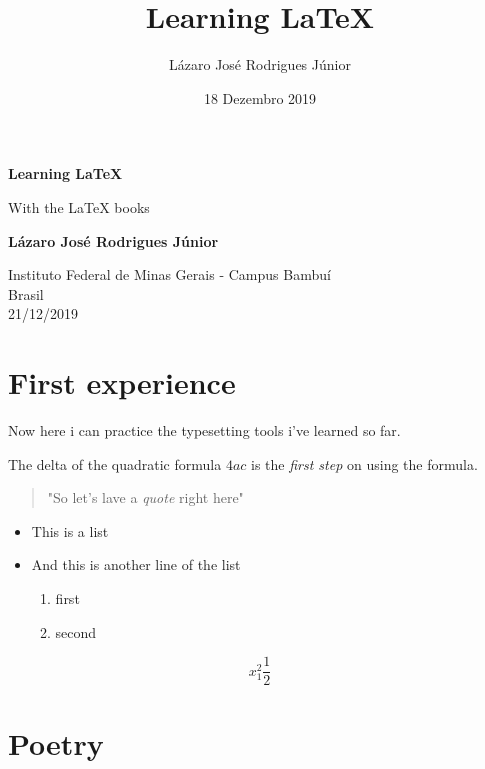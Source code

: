 \documentclass[titlepage]{article}
\title{Learning LaTeX}
\author{Lázaro José Rodrigues Júnior}
\date{18 Dezembro 2019}
\begin{document}
\begin{titlepage}
    \begin{center}
        \vspace*{1cm}
        \Huge
        \textbf{Learning LaTeX}
        \vspace{0.5cm}

        \LARGE
        With the LaTeX books

        \vspace{1.5cm}
        \textbf{Lázaro José Rodrigues Júnior}
        \vfill

        \Large
        Instituto Federal de Minas Gerais - Campus Bambuí\\
        Brasil\\
        21/12/2019
 
    \end{center}
\end{titlepage}

\maketitle

\section{First experience}

Now here i can practice the typesetting tools i've learned so far.


The delta of the quadratic formula $4ac$ is the \emph{first step} on using the formula. 
\begin{quote}
"So let's lave a \emph{quote} right here"
\end{quote}

\begin{itemize}
\item This is a list
\item And this is another line of the list
\begin{enumerate}
\item first
\item second
\end{enumerate}
\end{itemize}

\begin{equation}
x_{1}^{2}
\frac{1}{2}
\end{equation}

\section{Poetry}
\end{document}
